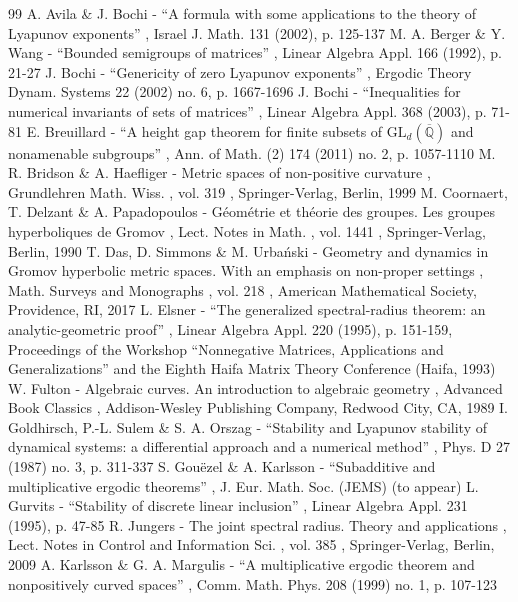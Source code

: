 \documentclass[11pt]{article}
\theoremstyle{plain}
\theoremstyle{definition}
\begin{document}
\begin{thebibliography}{99}
 A. Avila \& J. Bochi - “A formula with some applications to the theory of Lyapunov exponents” , Israel J. Math. 131 (2002), p. 125-137
 M. A. Berger \& Y. Wang - “Bounded semigroups of matrices” , Linear Algebra Appl. 166 (1992), p. 21-27
 J. Bochi - “Genericity of zero Lyapunov exponents” , Ergodic Theory Dynam. Systems 22 (2002) no. 6, p. 1667-1696
 J. Bochi - “Inequalities for numerical invariants of sets of matrices” , Linear Algebra Appl. 368 (2003), p. 71-81
 E. Breuillard - “A height gap theorem for finite subsets of \(\mathrm{GL}_d(\overline{\mathbb Q})\) and nonamenable subgroups” , Ann. of Math. (2) 174 (2011) no. 2, p. 1057-1110
 M. R. Bridson \& A. Haefliger - Metric spaces of non-positive curvature , Grundlehren Math. Wiss. , vol. 319 , Springer-Verlag, Berlin, 1999
 M. Coornaert, T. Delzant \& A. Papadopoulos - Géométrie et théorie des groupes. Les groupes hyperboliques de Gromov , Lect. Notes in Math. , vol. 1441 , Springer-Verlag, Berlin, 1990
 T. Das, D. Simmons \& M. Urbański - Geometry and dynamics in Gromov hyperbolic metric spaces. With an emphasis on non-proper settings , Math. Surveys and Monographs , vol. 218 , American Mathematical Society, Providence, RI, 2017
 L. Elsner - “The generalized spectral-radius theorem: an analytic-geometric proof” , Linear Algebra Appl. 220 (1995), p. 151-159, Proceedings of the Workshop “Nonnegative Matrices, Applications and Generalizations” and the Eighth Haifa Matrix Theory Conference (Haifa, 1993)
 W. Fulton - Algebraic curves. An introduction to algebraic geometry , Advanced Book Classics , Addison-Wesley Publishing Company, Redwood City, CA, 1989
 I. Goldhirsch, P.-L. Sulem \& S. A. Orszag - “Stability and Lyapunov stability of dynamical systems: a differential approach and a numerical method” , Phys. D 27 (1987) no. 3, p. 311-337
 S. Gouëzel \& A. Karlsson - “Subadditive and multiplicative ergodic theorems” , J. Eur. Math. Soc. (JEMS) (to appear)
 L. Gurvits - “Stability of discrete linear inclusion” , Linear Algebra Appl. 231 (1995), p. 47-85
 R. Jungers - The joint spectral radius. Theory and applications , Lect. Notes in Control and Information Sci. , vol. 385 , Springer-Verlag, Berlin, 2009
 A. Karlsson \& G. A. Margulis - “A multiplicative ergodic theorem and nonpositively curved spaces” , Comm. Math. Phys. 208 (1999) no. 1, p. 107-123

\end{thebibliography}
\end{document}
